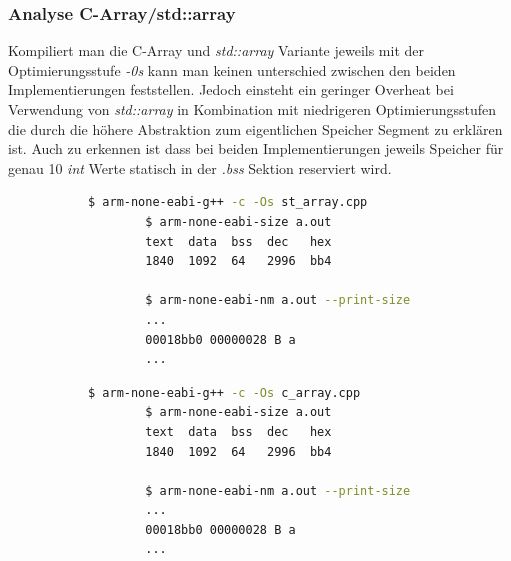 \documentclass[MES,Master,ngerman]{twbook}%
\begin{document}
\begin{figure}[!htb]
	\begin{subfigure}[b]{0.5\textwidth}
		
		\label{fig:7}
	\end{subfigure}
	\begin{subfigure}[b]{0.5\textwidth}
		
		\label{fig:8}
	\end{subfigure}
\end{figure}

\subsubsection{Analyse C-Array/std::array}
Kompiliert man die C-Array und \textit{std::array} Variante jeweils mit der Optimierungsstufe \textit{-0s} kann man keinen unterschied zwischen den beiden Implementierungen feststellen. Jedoch einsteht ein geringer Overheat bei Verwendung von \textit{std::array} in Kombination mit niedrigeren Optimierungsstufen die durch die höhere Abstraktion zum eigentlichen Speicher Segment zu erklären ist. Auch zu erkennen ist dass bei beiden Implementierungen jeweils Speicher für genau 10 \textit{int} Werte statisch in der \textit{.bss} Sektion reserviert wird.


\begin{figure}[!htb]
	\begin{subfigure}[b]{0.5\textwidth}
		\begin{lstlisting}[gobble=6, title={std::array}, language=bash, numbers=none]
		$ arm-none-eabi-g++ -c -Os st_array.cpp
		$ arm-none-eabi-size a.out
		text  data  bss  dec   hex
		1840  1092  64   2996  bb4
		
		$ arm-none-eabi-nm a.out --print-size
		...
		00018bb0 00000028 B a
		...
		\end{lstlisting}
	\end{subfigure}
	\begin{subfigure}[b]{0.5\textwidth}
		\begin{lstlisting}[gobble=6, title={C-Array}, language=bash, numbers=none]
		$ arm-none-eabi-g++ -c -Os c_array.cpp
		$ arm-none-eabi-size a.out
		text  data  bss  dec   hex
		1840  1092  64   2996  bb4
		
		$ arm-none-eabi-nm a.out --print-size
		...
		00018bb0 00000028 B a
		...
		\end{lstlisting}
	\end{subfigure}
\end{figure}
\end{document}

